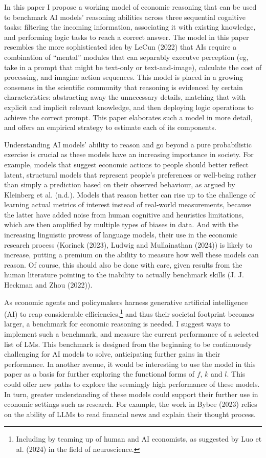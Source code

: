 \documentclass[
]{article}
\begin{document}
In this paper I propose a working model of economic reasoning that can
be used to benchmark AI models' reasoning abilities across three
sequential cognitive tasks: filtering the incoming information,
associating it with existing knowledge, and performing logic tasks to
reach a correct answer. The model in this paper resembles the more
sophisticated idea by LeCun (2022) that AIs require a combination of
``mental'' modules that can separably executve perception (eg, take in a
prompt that might be text-only or text-and-image), calculate the cost of
processing, and imagine action sequences. This model is placed in a
growing consensus in the scientific community that reasoning is
evidenced by certain characteristics: abstracting away the unnecessary
details, matching that with explicit and implicit relevant knowledge,
and then deploying logic operations to achieve the correct prompt. This
paper elaborates such a model in more detail, and offers an empirical
strategy to estimate each of its components.

Understanding AI models' ability to reason and go beyond a pure
probabilistic exercise is crucial as these models have an increasing
importance in society. For example, models that suggest economic actions
to people should better reflect latent, structural models that represent
people's preferences or well-being rather than simply a prediction based
on their observed behaviour, as argued by Kleinberg et al. (n.d.).
Models that reason better can rise up to the challenge of learning
actual metrics of interest instead of real-world measurements, because
the latter have added noise from human cognitive and heuristics
limitations, which are then amplified by multiple types of biases in
data. And with the increasing linguistic prowess of language models,
their use in the economic research process (Korinek (2023), Ludwig and
Mullainathan (2024)) is likely to increase, putting a premium on the
ability to measure how well these models can reason. Of course, this
should also be done with care, given results from the human literature
pointing to the inability to actually benchmark skills (J. J. Heckman
and Zhou (2022)).

As economic agents and policymakers harness generative artificial
intelligence (AI) to reap considerable efficiencies,\footnote{Including
  by teaming up of human and AI economists, as suggested by Luo et al.
  (2024) in the field of neuroscience.} and thus their societal
footprint becomes larger, a benchmark for economic reasoning is needed.
I suggest ways to implement such a benchmark, and measure the current
performance of a selected list of LMs. This benchmark is designed from
the beginning to be continuously challenging for AI models to solve,
anticipating further gains in their performance. In another avenue, it
would be interesting to use the model in this paper as a basis for
further exploring the functional forms of \(f\), \(k\) and \(l\). This
could offer new paths to explore the seemingly high performance of these
models. In turn, greater understanding of these models could support
their further use in economic settings such as research. For example,
the work in Bybee (2023) relies on the ability of LLMs to read financial
news and explain their thought process.
\end{document}
